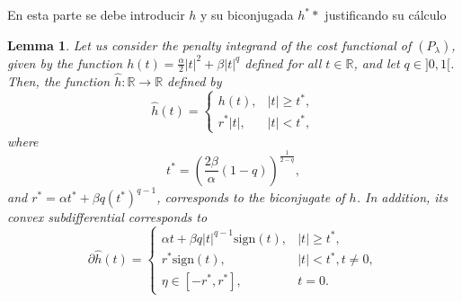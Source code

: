 \documentclass[11pt,a4paper]{amsart}
\newcommand{\sign}{\mathrm{sign}}
\newtheorem{lemma}{{Lemma}}
\begin{document}
{\color{red} En esta parte se debe introducir $h$ y su biconjugada $h^**$ justificando su cálculo 
\begin{lemma}\label{l:biconjugate}
    Let us consider the penalty integrand of the cost functional of $(P_\lambda)$, given by the function $h(t)=\frac{\alpha}{2}|t|^2+\beta |t|^q$ defined  for all $t\in \mathbb{R}$, and let $q\in ]0,1[$. Then, the function $\widehat{h}:\mathbb{R}\to \mathbb{R}$ defined by
    \begin{equation}\label{biconjugate}
       \widehat{h}(t)=\begin{cases}
            h(t),&|t|\ge t^*,\\
            r^*|t|,&|t|<t^*,
        \end{cases}
    \end{equation}
where
\[
    t^*=\left(\frac{2\beta}{\alpha}(1-q)\right)^{\frac{1}{2-q}},
\]
and $r^*=\alpha t^*+\beta q(t^*)^{q-1}$, corresponds to the biconjugate of $h$. In addition, its convex subdifferential corresponds to
   \begin{equation}\label{sub_biconjugate}
       \partial \widehat{h}(t)=\begin{cases}
           \alpha t+\beta q |t|^{q-1}\sign(t), &|t|\ge t^*,\\                     
           r^*\sign(t), &|t|<t^*, t\ne 0,\\
           \eta\in [-r^*,r^*], &t=0.
       \end{cases}
   \end{equation}
\end{lemma}
}
\end{document}

